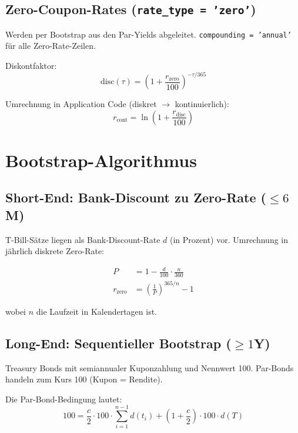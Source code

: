 \documentclass[11pt, a4paper]{article}
\begin{document}
\subsection{Zero-Coupon-Rates (\texttt{rate\_type = 'zero'})}

Werden per Bootstrap aus den Par-Yields abgeleitet.
\texttt{compounding = 'annual'} für alle Zero-Rate-Zeilen.

Diskontfaktor:
\begin{equation}
  \mathrm{disc}(\tau) = \left(1 + \frac{r_{\mathrm{zero}}}{100}\right)^{-\tau/365}
  \label{eq:discfactor}
\end{equation}

Umrechnung in Application Code (diskret $\to$ kontinuierlich):
\begin{equation}
  r_{\mathrm{cont}} = \ln\!\left(1 + \frac{r_{\mathrm{disc}}}{100}\right)
  \label{eq:disc2cont}
\end{equation}

\section{Bootstrap-Algorithmus}
\label{sec:bootstrap}

\subsection{Short-End: Bank-Discount zu Zero-Rate ($\leq 6$M)}

T-Bill-Sätze liegen als Bank-Discount-Rate $d$ (in Prozent) vor.
Umrechnung in jährlich diskrete Zero-Rate:

\begin{align}
  P &= 1 - \frac{d}{100} \cdot \frac{n}{360} \label{eq:tbill_price} \\[4pt]
  r_{\mathrm{zero}} &= \left(\frac{1}{P}\right)^{365/n} - 1 \label{eq:tbill_zero}
\end{align}

wobei $n$ die Laufzeit in Kalendertagen ist.

\subsection{Long-End: Sequentieller Bootstrap ($\geq 1$Y)}

Treasury Bonds mit semiannualer Kuponzahlung und Nennwert 100.
Par-Bonds handeln zum Kurs 100 (Kupon = Rendite).

Die Par-Bond-Bedingung lautet:
\begin{equation}
  100 = \frac{c}{2} \cdot 100 \cdot \sum_{i=1}^{n-1} d(t_i)
        + \left(1 + \frac{c}{2}\right) \cdot 100 \cdot d(T)
  \label{eq:parbond}
\end{equation}
\end{document}
